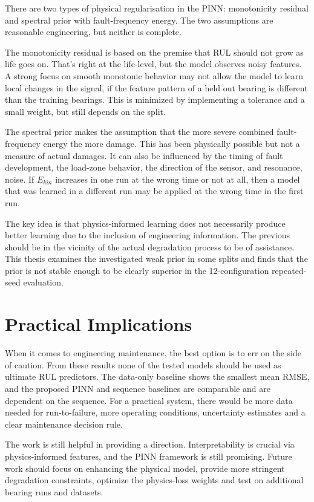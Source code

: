 There are two types of physical regularisation in the PINN: monotonicity residual and spectral prior with fault-frequency energy. The two assumptions are reasonable engineering, but neither is complete.

The monotonicity residual is based on the premise that RUL should not grow as life goes on. That's right at the life-level, but the model observes noisy features. A strong focus on smooth monotonic behavior may not allow the model to learn local changes in the signal, if the feature pattern of a held out bearing is different than the training bearings. This is minimized by implementing a tolerance and a small weight, but still depends on the split.

The spectral prior makes the assumption that the more severe combined fault-frequency energy the more damage. This has been physically possible but not a measure of actual damages. It can also be influenced by the timing of fault development, the load-zone behavior, the direction of the sensor, and resonance, noise. If $E_{kin}$ increases in one run at the wrong time or not at all, then a model that was learned in a different run may be applied at the wrong time in the first run.

The key idea is that physics-informed learning does not necessarily produce better learning due to the inclusion of engineering information. The previous should be in the vicinity of the actual degradation process to be of assistance. This thesis examines the investigated weak prior in some splits and finds that the prior is not stable enough to be clearly superior in the 12-configuration repeated-seed evaluation.

\section{Practical Implications}

When it comes to engineering maintenance, the best option is to err on the side of caution. From these results none of the tested models should be used as ultimate RUL predictors. The data-only baseline shows the smallest mean RMSE, and the proposed PINN and sequence baselines are comparable and are dependent on the sequence. For a practical system, there would be more data needed for run-to-failure, more operating conditions, uncertainty estimates and a clear maintenance decision rule.

The work is still helpful in providing a direction. Interpretability is crucial via physics-informed features, and the PINN framework is still promising. Future work should focus on enhancing the physical model, provide more stringent degradation constraints, optimize the physics-loss weights and test on additional bearing runs and datasets.

